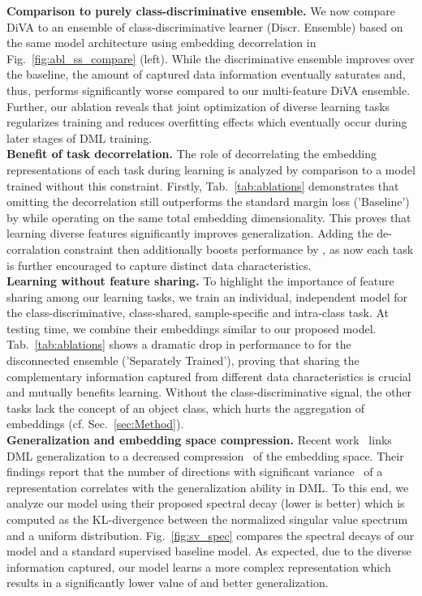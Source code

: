 \documentclass[runningheads]{llncs}
\begin{document}
 \noindent
\textbf{Comparison to purely class-discriminative ensemble.} 
We now compare DiVA to an ensemble of class-discriminative learner (Discr. Ensemble) based on the same model architecture using embedding decorrelation in Fig.~\ref{fig:abl_ss_compare} (left). While the discriminative ensemble improves over the baseline, the amount of captured data information eventually saturates and, thus, performs significantly worse compared to our multi-feature DiVA ensemble. Further, our ablation reveals that joint optimization of diverse learning tasks regularizes training and reduces overfitting effects which eventually occur during later stages of DML training.
\\
\noindent
\textbf{Benefit of task decorrelation.} 
The role of decorrelating the embedding representations of each task during learning is analyzed by comparison to a model trained without this constraint. Firstly, Tab.~\ref{tab:ablations} demonstrates that omitting the decorrelation still outperforms the standard margin loss ('Baseline') by  while operating on the same total embedding dimensionality. This proves that learning diverse features significantly improves generalization. Adding the de-corralation constraint then additionally boosts performance by , as now each task is further encouraged to capture distinct data characteristics. 
\\
\noindent
\textbf{Learning without feature sharing.} To highlight the importance of feature sharing among our learning tasks, we train an individual, independent model for the class-discriminative, class-shared, sample-specific and intra-class task. At testing time, we combine their embeddings similar to our proposed model. Tab.~\ref{tab:ablations} shows a dramatic drop in performance to  for the disconnected ensemble ('Separately Trained'), proving that sharing the complementary information captured from different data characteristics is crucial and mutually benefits learning. Without the class-discriminative signal, the other tasks lack the concept of an object class, which hurts the aggregation of embeddings (cf. Sec.~\ref{sec:Method}). 
\\
\noindent
\textbf{Generalization and embedding space compression.} 
Recent work~\cite{roth2020revisiting} links DML generalization to a decreased compression~\cite{tishby2015deep} of the embedding space. Their findings report that the number of directions with significant variance~\cite{manifoldmixup,roth2020revisiting} of a representation correlates with the generalization ability in DML. To this end, we analyze our model using their proposed spectral decay  (lower is better) which is computed as the KL-divergence between the normalized singular value spectrum and a uniform distribution. Fig.~\ref{fig:sv_spec} compares the spectral decays of our model and a standard supervised baseline model. As expected, due to the diverse information captured, our model learns a more complex representation which results in a significantly lower value of  and better generalization.
\end{document}
